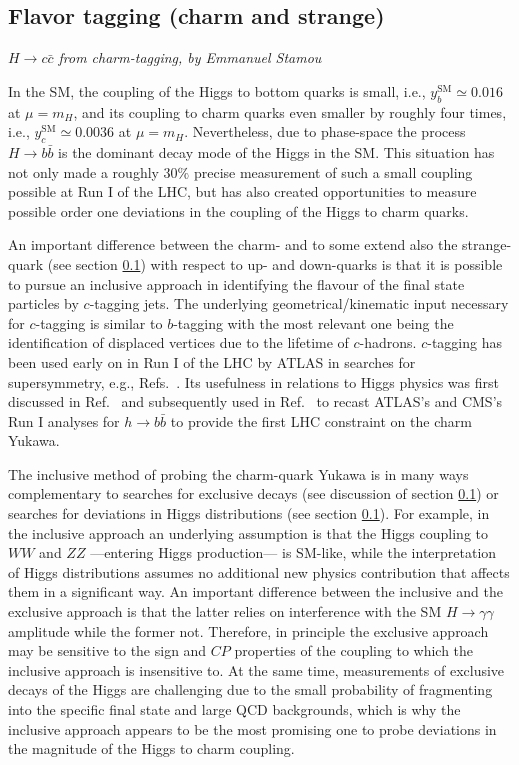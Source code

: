 \documentclass[../report.tex]{subfiles}
\begin{document}
\subsection{Flavor tagging (charm and strange)}

\begin{center}{\emph{$H \rightarrow c \bar{c}$ from charm-tagging, by Emmanuel Stamou}} \end{center}

In the SM, the coupling of the Higgs to bottom quarks is small, i.e.,
$y_b^{\text{SM}}\simeq 0.016$ at $\mu=m_H$, and 
its coupling to charm quarks even smaller by roughly four times,
i.e., $y_c^{\text{SM}}\simeq 0.0036$ at $\mu=m_H$.
Nevertheless, due to phase-space the process $H\to b\bar b$ is the dominant 
decay mode of the Higgs in the SM.
This situation has not only made a roughly $30\%$ precise measurement of such 
a small coupling possible at Run I of the LHC, but has also created 
opportunities to measure possible order one deviations in the 
coupling of the Higgs to charm quarks.

An important difference between the charm- and to some extend also 
the strange-quark (see section \ref{}) with respect to up- and 
down-quarks is that it is possible to pursue an inclusive approach in
identifying the flavour of the final state particles by $c$-tagging jets.
The underlying geometrical/kinematic input necessary for $c$-tagging
is similar to $b$-tagging with the most relevant one being the identification
of displaced vertices due to the lifetime of $c$-hadrons.
$c$-tagging has been used early on in Run I of the LHC by ATLAS in 
searches for supersymmetry, e.g., Refs.~\cite{Aad:2014nra,Aad:2015gna}.
Its usefulness in relations to Higgs physics was first discussed 
in Ref.~\cite{Delaunay:2013pja} and subsequently
used in Ref.~\cite{Perez:2015aoa} to recast ATLAS's and CMS's Run I 
analyses for $h\to b\bar b$ to provide the first LHC 
constraint on the charm Yukawa. 

The inclusive method of probing the charm-quark Yukawa is in many ways complementary 
to searches for exclusive decays (see discussion of section \ref{}) or 
searches for deviations in Higgs distributions (see section \ref{}).
For example, in the inclusive approach an underlying assumption is 
that the Higgs coupling to $WW$ and $ZZ$ ---entering Higgs production--- is SM-like,
while the interpretation of Higgs distributions
assumes no additional new physics contribution that affects them in a significant way.
An important difference between the inclusive and the exclusive approach 
is that the latter relies on interference with the SM $H\to \gamma\gamma$ 
amplitude while the former not.
Therefore, in principle the exclusive approach may be sensitive to the sign and 
$CP$ properties of the coupling to which the inclusive approach is insensitive to.
At the same time, measurements of exclusive decays of the Higgs are challenging due 
to the small probability of fragmenting into the specific final state and 
large QCD backgrounds, which is why the inclusive approach appears to be the most promising
one to probe deviations in the magnitude of the Higgs to charm coupling.
\end{document}
